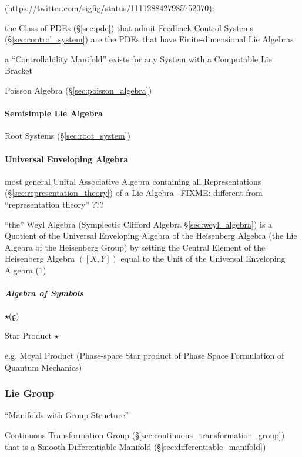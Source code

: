 (\url{https://twitter.com/sigfig/status/1111288427985752070}):

the Class of PDEs (\S\ref{sec:pde}) that admit Feedback Control Systems
(\S\ref{sec:control_system}) are the PDEs that have Finite-dimensional Lie
Algebras

a ``Controllability Manifold'' exists for any System with a Computable Lie
Bracket

Poisson Algebra (\S\ref{sec:poisson_algebra})



\paragraph{Semisimple Lie Algebra}\label{sec:semisimple_lie}\hfill

Root Systems (\S\ref{sec:root_system})



\paragraph{Universal Enveloping Algebra}
\label{sec:universal_enveloping_algebra}\hfill

most general Unital Associative Algebra containing all Representations
(\S\ref{sec:representation_theory}) of a Lie Algebra
--FIXME: different from ``representation theory'' ???

\fist ``the'' Weyl Algebra (Symplectic Clifford Algebra
\S\ref{sec:weyl_algebra}) is a Quotient of the Universal Enveloping Algebra of
the Heisenberg Algebra (the Lie Algebra of the Heisenberg Group) by setting the
Central Element of the Heisenberg Algebra $([X,Y])$ equal to the Unit of the
Universal Enveloping Algebra ($1$)



\subparagraph{Algebra of Symbols}\label{sec:symbol_algebra}\hfill

$\star(\mathfrak{g})$

Star Product $\star$

e.g. Moyal Product (Phase-space Star product of Phase Space Formulation of
Quantum Mechanics)



\subsubsection{Lie Group}\label{sec:lie_group}

``Manifolds with Group Structure''

Continuous Transformation Group
(\S\ref{sec:continuous_transformation_group}) that is a Smooth
Differentiable Manifold (\S\ref{sec:differentiable_manifold})

